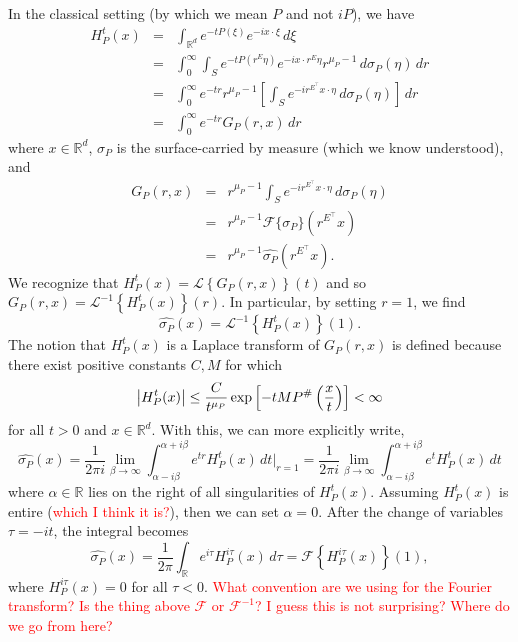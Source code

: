 \documentclass[11pt]{article}
\newcommand\R{\mathbb{R}}
\newcommand{\lp}{\left(}
\newcommand{\rp}{\right)}
\newcommand{\lb}{\left[}
\newcommand{\rb}{\right]}
\newcommand{\lc}{\left\{}
\newcommand{\rc}{\right\}}
\newcommand{\f}[2]{\frac{#1}{#2}}
\newcommand{\be}{\beta}
\newcommand{\FT}{\mathcal{F}}
\newcommand{\LT}{\mathcal{L}}
\begin{document}
In the classical setting (by which we mean $P$ and not $iP$), we have 
\begin{eqnarray*}
    H^t_P(x) 
    &=& \int_{\R^d} e^{-t P(\xi)}e^{-i x \cdot \xi}\,d\xi \\
    &=& \int_{0}^\infty \int_S e^{-t P(r^E \eta)} e^{ - i x \cdot r^E \eta } r^{\mu_P - 1}\,d\sigma_P(\eta)\,dr   \\
    &=&  \int_{0}^\infty e^{-tr} r^{\mu_P - 1} \lb  \int_S  e^{-i r^{E^\top} x \cdot \eta } \,d\sigma_P(\eta) \rb  \,dr   \\
    &=& \int^\infty_0 e^{-tr} G_P(r,x) \,dr
\end{eqnarray*}
where $x\in \R^d$, $\sigma_P$ is the surface-carried by measure (which we know understood), and 
\begin{eqnarray*}
    G_P(r,x) 
    &=& r^{\mu_P - 1} \int_S  e^{-i r^{E^\top} x \cdot \eta } \,d\sigma_P(\eta) \\ 
    &=& r^{\mu_P - 1} \FT\{\sigma_P\}\lp r^{E^\top} x \rp \\
    &=& r^{\mu_P - 1} \widehat{\sigma_P}\lp r^{E^\top}x \rp.
\end{eqnarray*}
We recognize that $H^t_P(x) = \LT\lc G_P(r,x) \rc (t)$ and so
$G_P(r,x) = \LT^{-1}\lc H^t_P(x)\rc(r)$. In particular, by setting $r=1$, we find
\begin{equation*}
    \widehat{\sigma_P}(x) = \LT^{-1}\lc H^t_P(x)\rc (1).
\end{equation*}
The notion that $H^t_P(x)$ is a Laplace transform of $G_P(r,x)$ is defined because there exist positive constants $C,M$ for which
\begin{equation*}
    \abs{H^t_P(x)} \leq \f{C}{t^{\mu_P}}\exp\lb -t M P^\# \lp \f{x}{t} \rp \rb < \infty
\end{equation*}
for all $t >0$  and $x \in \R^d$. With this, we can more explicitly write,
\begin{equation*}
    \widehat{\sigma_P}(x) = \f{1}{2\pi i}\lim_{\be\to \infty} \int^{\alpha+i\beta}_{\alpha-i\beta} e^{tr} H_P^t(x)\,dt\bigg\vert_{r=1} = \f{1}{2\pi i}\lim_{\be\to \infty} \int^{\alpha+i\beta}_{\alpha-i\beta} e^{t} H_P^t(x)\,dt
\end{equation*}
where $\alpha \in \R$ lies on the right of all singularities of $H_P^t(x)$. Assuming $H_P^t(x)$ is entire (\textcolor{red}{which I think it is?}), then we can set $\alpha = 0$. After the change of variables $\tau = -it$, the integral becomes
\begin{equation*}
    \widehat{\sigma_P}(x)  = \f{1}{2\pi }\int_{\R} e^{i\tau} H_P^{i\tau}(x) \,d\tau = \FT\lc H_P^{i\tau}(x) \rc(1),
\end{equation*}
where $H^{i\tau}_P(x) = 0$ for all $\tau < 0$. \textcolor{red}{What convention are we using for the Fourier transform? Is the thing above $\FT$ or $\FT^{-1}$? I guess this is not surprising? Where do we go from here?}
\end{document}
